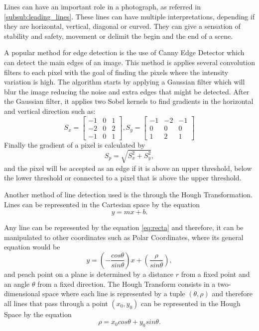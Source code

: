 Lines can have an important role in a photograph, as referred in \ref{subsub:leading_lines}. These lines can have multiple interpretations, depending if they are horizontal, vertical, diagonal or curved. They can give a sensation of stability and safety, movement or delimit the begin and the end of a scene.

A popular method for edge detection is the use of Canny Edge Detector\cite{canny1986computational} which can detect the main edges of an image. This method is applies several convolution filters to each pixel with the goal of finding the pixels where the intensity variation is high\cite{nobrega2013interactive}.
The algorithm starts by applying a Gaussian filter which will blur the image reducing the noise and extra edges that might be detected. After the Gaussian filter, it applies two Sobel kernels to find gradients in the horizontal and vertical direction such as:
\begin{equation}
S_{x} =
\begin{bmatrix}
	-1 & 0 & 1\\
	-2 & 0 & 2\\
	-1 & 0 & 1
\end{bmatrix}
,
S_{y} = 
\begin{bmatrix}
	-1 & -2 & -1\\
	0 & 0 & 0\\
	1 & 2 & 1
\end{bmatrix}
\end{equation}
Finally the gradient of a pixel is calculated by
\begin{equation}
	S_{p} = \sqrt{S_{x}^{2} + S_{y}^{2}},
\end{equation}
and the pixel will be accepted as an edge if it is above an upper threshold, below the lower threshold or connected to a pixel that is above the upper threshold.

Another method of line detection used is the through the Hough Transformation\cite{illingworth1988survey}. Lines can be represented in the Cartesian space by the equation
\begin{equation}
	y=mx+b.
	\label{eq:recta}
\end{equation}

Any line can be represented by the equation \ref{eq:recta} and therefore, it can be manipulated to other coordinates such as Polar Coordinates, where its general equation would be
\begin{equation}
	y=\left( -\frac{cos \theta}{sin \theta} \right) x + \left(\frac{\rho}{sin \theta}\right),
\end{equation}
and peach point on a plane is determined by a distance $r$ from a fixed point and an angle $\theta$ from a fixed direction.
The Hough Transform consists in a two-dimensional space where each line is represented by a tuple $(\theta,\rho)$ and therefore all lines that pass through a point $(x_{0}, y_{0})$ can be represented in the Hough Space by the equation
\begin{equation}
\rho = x_{0}cos\theta + y_{0}sin\theta.
\label{eq:hough_eq}
\end{equation}

